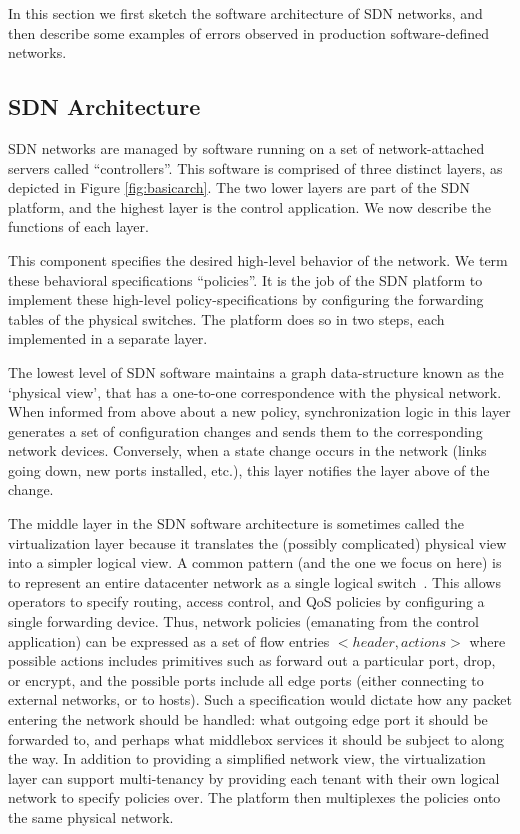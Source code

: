 In this section we first sketch the software architecture of SDN networks, and then describe some examples
of errors observed in production software-defined networks.

\subsection{SDN Architecture}

SDN networks are managed by software running on a set of network-attached servers called ``controllers''. This software is comprised of three distinct layers, as
depicted in Figure \ref{fig:basicarch}. The two lower layers are part of the SDN platform, and the highest layer is the control application. We now describe the functions of each layer.

 This component specifies the desired
high-level behavior of the network. We term these behavioral specifications ``policies''. It is the job of the SDN platform to implement these high-level policy-specifications by configuring the forwarding tables of the physical switches. The platform does so in two steps, each implemented in a separate layer.

 The lowest level of SDN software maintains a graph data-structure known as
the `physical view', that has a one-to-one correspondence with the physical
network. When informed from above about a new policy,
synchronization logic in this layer generates a set of configuration changes and sends them to the
corresponding network devices. Conversely, when a state change
occurs in the network (links going down, new ports installed, etc.), this layer notifies the layer above of the change.

 The middle layer in the SDN software architecture is sometimes called the virtualization layer because it translates the (possibly complicated) physical view into a simpler logical view. A common pattern (and the one we focus on here) is to represent an entire
datacenter network as a single logical
switch~\cite{Casado:2010:VNF:1921151.1921162}. This allows operators
to specify routing, access control, and QoS policies by configuring a single forwarding
device. Thus, network policies (emanating from the control application) can be
expressed as a set of flow entries $<header, actions>$ where possible actions
includes primitives such as forward out a particular port, drop, or encrypt,
and the possible ports include all edge ports (either connecting to external
networks, or to hosts). Such a specification would dictate how any packet
entering the network should be handled: \ie{} what outgoing edge port it should be forwarded to, and perhaps what middlebox services it should be subject to along the way.   
In addition to providing a simplified network view, the virtualization layer
can support multi-tenancy by providing each tenant with their own logical
network to specify policies over. The platform then multiplexes the policies onto the same physical network.

